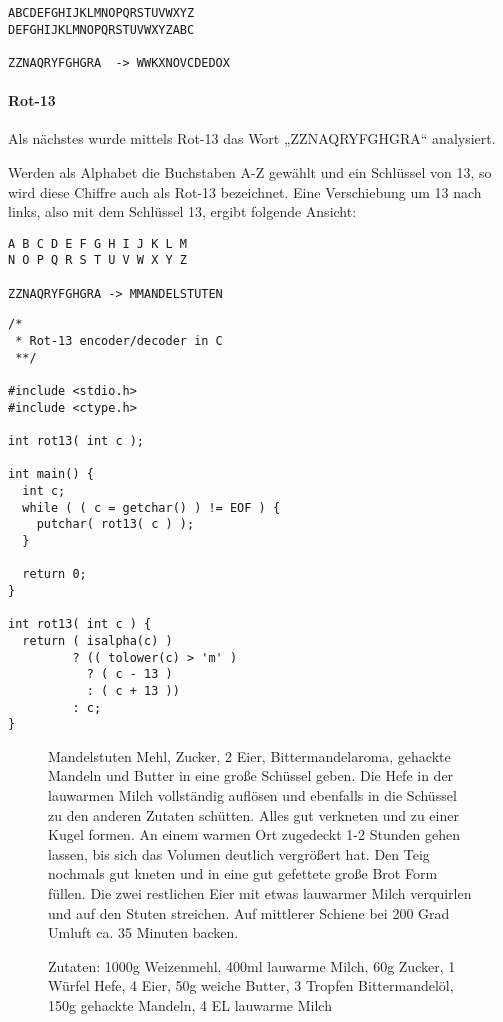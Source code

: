 \begin{lstlisting}
ABCDEFGHIJKLMNOPQRSTUVWXYZ
DEFGHIJKLMNOPQRSTUVWXYZABC

ZZNAQRYFGHGRA  -> WWKXNOVCDEDOX
\end{lstlisting}

\paragraph{Rot-13}

Als nächstes wurde mittels Rot-13 das Wort „ZZNAQRYFGHGRA“ analysiert.

Werden als Alphabet die Buchstaben A-Z gewählt und ein Schlüssel von 13, so wird
diese Chiffre auch als Rot-13 bezeichnet. Eine Verschiebung um 13 nach links,
also mit dem Schlüssel 13, ergibt folgende Ansicht:

\begin{lstlisting}
A B C D E F G H I J K L M
N O P Q R S T U V W X Y Z

ZZNAQRYFGHGRA -> MMANDELSTUTEN
\end{lstlisting}

\begin{lstlisting}[caption=Quellcode rot13.c]
/*
 * Rot-13 encoder/decoder in C
 **/

#include <stdio.h>
#include <ctype.h>

int rot13( int c );

int main() {
  int c;
  while ( ( c = getchar() ) != EOF ) {
    putchar( rot13( c ) );
  }

  return 0;
}

int rot13( int c ) {
  return ( isalpha(c) )
         ? (( tolower(c) > 'm' )
           ? ( c - 13 )
           : ( c + 13 ))
         : c;
}
\end{lstlisting}

\begin{figure}
Mandelstuten
Mehl, Zucker, 2 Eier, Bittermandelaroma, gehackte Mandeln und Butter in eine große Schüssel geben.
Die Hefe in der lauwarmen Milch vollständig auflösen und ebenfalls in die Schüssel zu den anderen Zutaten schütten. Alles gut verkneten und zu einer Kugel formen.
An einem warmen Ort zugedeckt 1-2 Stunden gehen lassen, bis sich das Volumen deutlich vergrößert hat.
Den Teig nochmals gut kneten und in eine gut gefettete große Brot Form füllen.
Die zwei restlichen Eier mit etwas lauwarmer Milch verquirlen und auf den Stuten streichen.
Auf mittlerer Schiene bei 200 Grad Umluft ca. 35 Minuten backen.

Zutaten: 1000g Weizenmehl, 400ml lauwarme Milch, 60g Zucker, 1 Würfel Hefe, 4 Eier, 50g weiche Butter, 3 Tropfen Bittermandelöl,
150g gehackte Mandeln, 4 EL lauwarme Milch
\end{figure}

